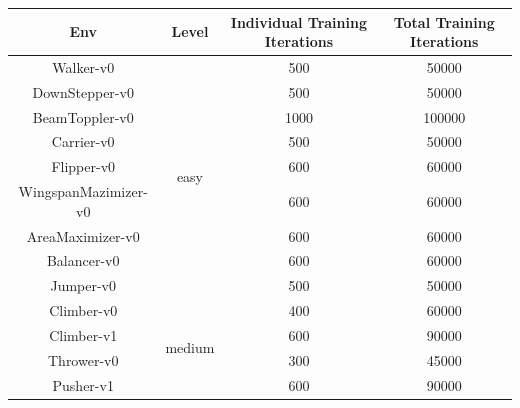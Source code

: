 \documentclass{article}
\begin{document}
    \begin{table}[H]
        \centering
        \small
        \begin{tabular}{cccc}
            \toprule \textbf{Env}  & \textbf{Level}          & \textbf{Individual Training Iterations} & \textbf{Total Training Iterations} \\
            \midrule Walker-v0     & \multirow{9}{*}{easy}   & 500                                     & 50000                              \\
            DownStepper-v0         &                         & 500                                     & 50000                              \\
            BeamToppler-v0         &                         & 1000                                    & 100000                             \\
            Carrier-v0             &                         & 500                                     & 50000                              \\
            Flipper-v0             &                         & 600                                     & 60000                              \\
            WingspanMazimizer-v0   &                         & 600                                     & 60000                              \\
            AreaMaximizer-v0       &                         & 600                                     & 60000                              \\
            Balancer-v0            &                         & 600                                     & 60000                              \\
            Jumper-v0              &                         & 500                                     & 50000                              \\
            \midrule Climber-v0    & \multirow{9}{*}{medium} & 400                                     & 60000                              \\
            Climber-v1             &                         & 600                                     & 90000                              \\
            Thrower-v0             &                         & 300                                     & 45000                              \\
            Pusher-v1              &                         & 600                                     & 90000                              \\

\end{tabular}
\end{table}
\end{document}
